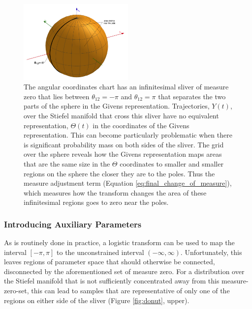 \documentclass[ba]{imsart}
\numberwithin{equation}{section}
\theoremstyle{plain}
\begin{document}
\begin{figure}[h]
\centering
\vspace{.1in}
\includegraphics[width=0.5\textwidth]{figures/sliver_globe.png}
\vspace{.05in}
\caption{The angular coordinates chart has an infinitesimal sliver of measure zero that lies between $\theta_{12} = -\pi$ and $\theta_{12} = \pi$ that separates the two parts of the sphere in the Givens representation. Trajectories, $Y(t)$, over the Stiefel manifold that cross this sliver have no equivalent representation, $\Theta(t)$ in the coordinates of the Givens representation. This can become particularly problematic when there is significant probability mass on both sides of the sliver. The grid over the sphere reveals how the Givens representation maps areas that are the same size in the $\Theta$ coordinates to smaller and smaller regions on the sphere the closer they are to the poles. Thus the measure adjustment term (Equation \ref{eq:final_change_of_measure}), which measures how the transform changes the area of these infinitesimal regions goes to zero near the poles.}
\label{fig:pathologies}
\end{figure}

\subsubsection{Introducing Auxiliary Parameters}
\noindent As is routinely done in practice, a logistic transform can be used to map the interval $[-\pi,\pi]$ to the unconstrained interval $(-\infty, \infty)$. Unfortunately, this leaves regions of parameter space that should otherwise be connected, disconnected by the aforementioned set of measure zero. For a distribution over the Stiefel manifold that is not sufficiently concentrated away from this measure-zero-set, this can lead to samples that are representative of only one of the regions on either side of the sliver (Figure \ref{fig:donut}, upper).
\end{document}

